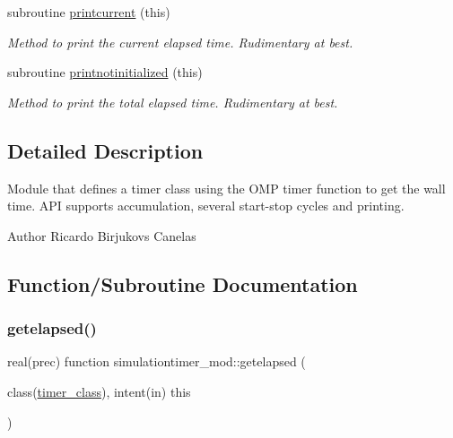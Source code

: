 \begin{DoxyCompactItemize}
subroutine \mbox{\hyperlink{namespacesimulationtimer__mod_abf4d4c3f383597e975e7c9d12dab6f13}{printcurrent}} (this)
\begin{DoxyCompactList}\small\item\em Method to print the current elapsed time. Rudimentary at best. \end{DoxyCompactList}\item 
subroutine \mbox{\hyperlink{namespacesimulationtimer__mod_a1c7581b4e12efde67021c8d94e0ef696}{printnotinitialized}} (this)
\begin{DoxyCompactList}\small\item\em Method to print the total elapsed time. Rudimentary at best. \end{DoxyCompactList}\end{DoxyCompactItemize}


\subsection{Detailed Description}
Module that defines a timer class using the O\+MP timer function to get the wall time. A\+PI supports accumulation, several start-\/stop cycles and printing. 

\begin{DoxyAuthor}{Author}
Ricardo Birjukovs Canelas 
\end{DoxyAuthor}


\subsection{Function/\+Subroutine Documentation}
\mbox{\label{namespacesimulationtimer__mod_a54fa7688c279c747bd76554fb8adb819}} 
\subsubsection{\texorpdfstring{getelapsed()}{getelapsed()}}
{\footnotesize\ttfamily real(prec) function simulationtimer\+\_\+mod\+::getelapsed (\begin{DoxyParamCaption}\item[{class(\mbox{\hyperlink{structsimulationtimer__mod_1_1timer__class}{timer\+\_\+class}}), intent(in)}]{this }\end{DoxyParamCaption})\hspace{0.3cm}{\ttfamily [private]}}



